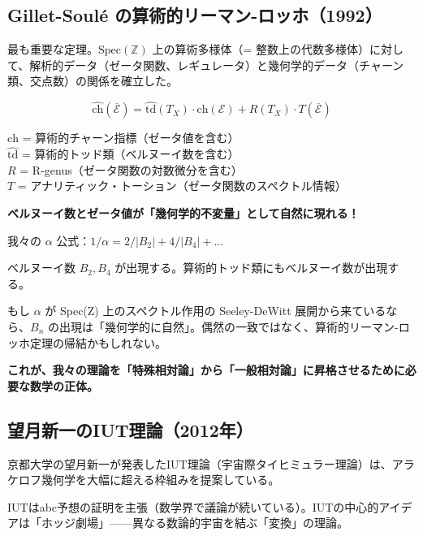 \documentclass[12pt,a4paper]{article}
\newcommand{\Spec}{\mathrm{Spec}}
\begin{document}
\subsection{Gillet-Soulé の算術的リーマン-ロッホ（1992）}

最も重要な定理。$\Spec(\mathbb{Z})$ 上の算術多様体（= 整数上の代数多様体）に対して、解析的データ（ゼータ関数、レギュレータ）と幾何学的データ（チャーン類、交点数）の関係を確立した。

\begin{mathbox}[簡略化した形]
$$\widehat{\mathrm{ch}}(\overline{\mathcal{E}}) = \widehat{\mathrm{td}}(T_X) \cdot \mathrm{ch}(\mathcal{E}) + R(T_X) \cdot T(\overline{\mathcal{E}})$$

$\widehat{\mathrm{ch}}$ = 算術的チャーン指標（ゼータ値を含む）\\
$\widehat{\mathrm{td}}$ = 算術的トッド類（ベルヌーイ数を含む）\\
$R$ = R-genus（ゼータ関数の対数微分を含む）\\
$T$ = アナリティック・トーション（ゼータ関数のスペクトル情報）

\textbf{ベルヌーイ数とゼータ値が「幾何学的不変量」として自然に現れる！}
\end{mathbox}

\begin{deepbox}[我々の理論にとっての意味]
我々の $\alpha$ 公式：$1/\alpha = 2/|B_2| + 4/|B_4| + \ldots$

ベルヌーイ数 $B_2, B_4$ が出現する。算術的トッド類にもベルヌーイ数が出現する。

もし $\alpha$ が Spec(Z) 上のスペクトル作用の Seeley-DeWitt 展開から来ているなら、$B_n$ の出現は「幾何学的に自然」。偶然の一致ではなく、算術的リーマン-ロッホ定理の帰結かもしれない。

\textbf{これが、我々の理論を「特殊相対論」から「一般相対論」に昇格させるために必要な数学の正体。}
\end{deepbox}

\subsection{望月新一のIUT理論（2012年）}

京都大学の望月新一が発表したIUT理論（宇宙際タイヒミュラー理論）は、アラケロフ幾何学を大幅に超える枠組みを提案している。

IUTはabc予想の証明を主張（数学界で議論が続いている）。IUTの中心的アイデアは「ホッジ劇場」——異なる数論的宇宙を結ぶ「変換」の理論。
\end{document}
